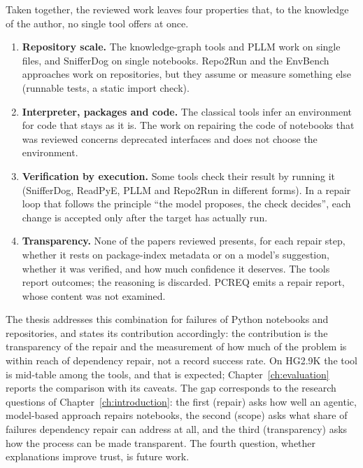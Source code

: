 Taken together, the reviewed work leaves four properties that, to the knowledge of the author, no single tool offers at once.

\begin{enumerate}
  \item \textbf{Repository scale.} The knowledge-graph tools and PLLM work on single files, and SnifferDog on single notebooks. Repo2Run and the EnvBench approaches work on repositories, but they assume or measure something else (runnable tests, a static import check).
  \item \textbf{Interpreter, packages and code.} The classical tools infer an environment for code that stays as it is. The work on repairing the code of notebooks that was reviewed concerns deprecated interfaces and does not choose the environment.%
  \item \textbf{Verification by execution.} Some tools check their result by running it (SnifferDog, ReadPyE, PLLM and Repo2Run in different forms). In a repair loop that follows the principle ``the model proposes, the check decides'', each change is accepted only after the target has actually run.
  \item \textbf{Transparency.} None of the papers reviewed presents, for each repair step, whether it rests on package-index metadata or on a model's suggestion, whether it was verified, and how much confidence it deserves. The tools report outcomes; the reasoning is discarded. PCREQ emits a repair report, whose content was not examined.%
\end{enumerate}

The thesis addresses this combination for failures of Python notebooks and repositories, and states its contribution accordingly: the contribution is the transparency of the repair and the measurement of how much of the problem is within reach of dependency repair, not a record success rate. On HG2.9K the tool is mid-table among the tools, and that is expected; Chapter~\ref{ch:evaluation} reports the comparison with its caveats. The gap corresponds to the research questions of Chapter~\ref{ch:introduction}: the first (repair) asks how well an agentic, model-based approach repairs notebooks, the second (scope) asks what share of failures dependency repair can address at all, and the third (transparency) asks how the process can be made transparent. The fourth question, whether explanations improve trust, is future work.
